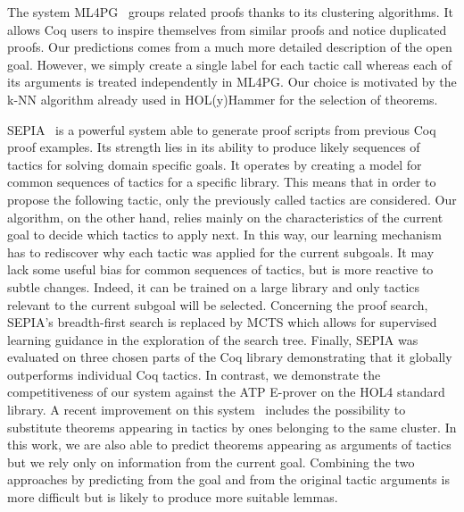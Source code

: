 \documentclass[runningheads,a4paper,draft]{svjour3}
\def\holfour{\textsf{HOL4}\xspace}
\def\coq{\textsf{Coq}\xspace}
\def\eprover{\textsf{E-prover}\xspace}
\def\holyhammer{\textsf{HOL(y)Hammer}\xspace}
\begin{document}
The system 
\textsf{ML4PG}~\cite{DBLP:journals/corr/abs-1212-3618,DBLP:journals/mics/HerasK14}
groups related proofs thanks to its clustering 
algorithms. It allows \coq users to inspire themselves from similar proofs and 
notice 
duplicated proofs. Our predictions comes from a much more detailed description 
of the open goal.
However, we simply create a single label for each tactic call whereas each of 
its
arguments is treated independently in \textsf{ML4PG}. 
Our choice is motivated by the k-NN algorithm already used in
\holyhammer for the selection of theorems.

\textsf{SEPIA}~\cite{DBLP:conf/cade/GransdenWR15} is a powerful system able to 
generate
proof scripts from previous \coq proof examples.
Its strength lies in its ability to produce likely sequences 
of tactics for solving domain specific goals. It operates by creating a model 
for common sequences of tactics for a specific library.
This means that in order to propose the following tactic, only the previously 
called tactics
are considered.
Our algorithm, on the other hand, relies mainly on the characteristics of the 
current goal 
to decide
which tactics to apply next. In this way, our learning mechanism has to 
rediscover why each 
tactic was applied for the current subgoals. It may lack some useful bias for 
common sequences 
of tactics, but is more reactive to subtle changes. Indeed, it can be trained 
on a large library and only tactics relevant to the current subgoal will be 
selected. 
Concerning the proof search, \textsf{SEPIA}'s %
breadth-first search is replaced by MCTS which allows for supervised learning
guidance in the exploration of the search tree.
Finally, \textsf{SEPIA} was evaluated on three chosen parts of the 
\coq library demonstrating that it globally outperforms individual \coq 
tactics. In contrast, we demonstrate the competitiveness of our system against 
the ATP \eprover on the \holfour standard library.
A recent improvement on this system~\cite{} includes the 
possibility to 
substitute theorems appearing in tactics by ones belonging to the same cluster. 
In this work, we are also able to predict theorems appearing as arguments of 
tactics but we rely only on information from the current goal. Combining the 
two approaches by predicting from the goal and from the original tactic 
arguments is more difficult but is likely to produce more suitable lemmas.
\end{document}
